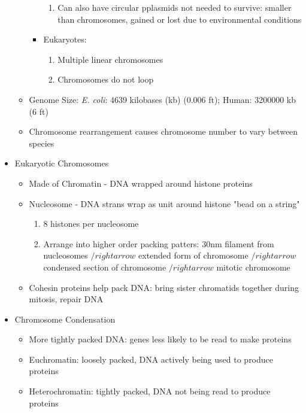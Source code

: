 \documentclass[12pt]{article}
\begin{document}
\begin{itemize}
\begin{itemize}
\begin{itemize}
\begin{enumerate}
                    \item Can also have circular pplasmids not needed to survive: smaller than chromosomes, gained or lost due to environmental conditions
                \end{enumerate}
                \item Eukaryotes:
                \begin{enumerate}
                    \item Multiple linear chromosomes
                    \item Chromosomes do not loop
                \end{enumerate}
            \end{itemize}
            \item Genome Size: \textit{E. coli}: 4639 kilobases (kb) (0.006 ft); Human: 3200000 kb (6 ft)
            \item Chromosome rearrangement causes chromosome number to vary between species
        \end{itemize}
        \item Eukaryotic Chromosomes
        \begin{itemize}
            \item Made of Chromatin - DNA wrapped around histone proteins
            \item Nucleosome - DNA strans wrap as unit around histone "bead on a string"
            \begin{enumerate}
                \item 8 histones per nucleosome
                \item Arrange into higher order packing patters: 30nm filament from nucleosomes $/rightarrow$ extended form of chromosome $/rightarrow$ condensed section of chromosome $/rightarrow$ mitotic chromosome
            \end{enumerate}
            \item Cohesin proteins help pack DNA: bring sister chromatids together during mitosis, repair DNA
        \end{itemize}
        \item Chromosome Condensation
        \begin{itemize}
            \item More tightly packed DNA: genes less likely to be read to make proteins
            \item Euchromatin: loosely packed, DNA actively being used to produce proteins
            \item Heterochromatin: tightly packed, DNA not being read to produce proteins

\end{itemize}
\end{itemize}
\end{document}
